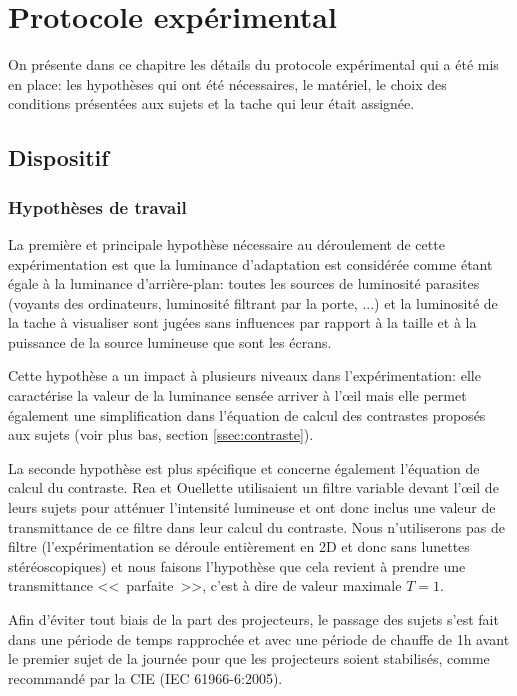 \chapter{Protocole expérimental}
\par On présente dans ce chapitre les détails du protocole expérimental qui a été mis en place: les hypothèses qui ont été nécessaires, le matériel, le choix des conditions présentées aux sujets et la tache qui leur était assignée.
	
	\section{Dispositif}
	\subsection{Hypothèses de travail}
	\label{ssec:hyp_travail}
	\par La première et principale hypothèse nécessaire au déroulement de cette expérimentation est que la luminance d'adaptation est considérée comme étant égale à la luminance d'arrière-plan: toutes les sources de luminosité parasites (voyants des ordinateurs, luminosité filtrant par la porte, ...) et la luminosité de la tache à visualiser sont jugées sans influences par rapport à la taille et à la puissance de la source lumineuse que sont les écrans.
	
	\par Cette hypothèse a un impact à plusieurs niveaux dans l'expérimentation: elle caractérise la valeur de la luminance sensée arriver à l'œil mais elle permet également une simplification dans l'équation de calcul des contrastes proposés aux sujets (voir plus bas, section \ref{ssec:contraste}).
	
	\par La seconde hypothèse est plus spécifique et concerne également l'équation de calcul du contraste. Rea et Ouellette utilisaient un filtre variable devant l'œil de leurs sujets pour atténuer l'intensité lumineuse et ont donc inclus une valeur de transmittance de ce filtre dans leur calcul du contraste. Nous n'utiliserons pas de filtre (l'expérimentation se déroule entièrement en 2D et donc sans lunettes stéréoscopiques) et nous faisons l'hypothèse que cela revient à prendre une transmittance <<~parfaite~>>, c'est à dire de valeur maximale $T = 1$.
	
	\par Afin d'éviter tout biais de la part des projecteurs, le passage des sujets s'est fait dans une période de temps rapprochée et avec une période de chauffe de 1h avant le premier sujet de la journée pour que les projecteurs soient stabilisés, comme recommandé par la CIE (IEC 61966-6:2005).
	
